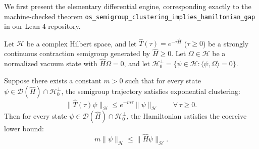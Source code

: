 We first present the elementary differential engine, corresponding exactly to the machine-checked theorem \texttt{os\_semigroup\_clustering\_implies\_hamiltonian\_gap} in our Lean 4 repository.

\begin{theorem}
\label{thm:elementary_differential_engine}
Let $\mathcal{H}$ be a complex Hilbert space, and let $\hat{T}(\tau) = e^{-\tau \hat{H}}$ ($\tau \ge 0$) be a strongly continuous contraction semigroup generated by $\hat{H} \ge 0$. Let $\Omega \in \mathcal{H}$ be a normalized vacuum state with $\hat{H}\Omega = 0$, and let $\mathcal{H}_0^\perp = \{\psi \in \mathcal{H} : \langle \psi, \Omega \rangle = 0\}$.

Suppose there exists a constant $m > 0$ such that for every state $\psi \in \mathcal{D}(\hat{H}) \cap \mathcal{H}_0^\perp$, the semigroup trajectory satisfies exponential clustering:
\begin{equation}
\label{eq:semigroup_exponential_clustering}
\|\hat{T}(\tau) \psi\|_{\mathcal{H}} \le e^{-m \tau} \|\psi\|_{\mathcal{H}} \qquad \forall \, \tau \ge 0.
\end{equation}
Then for every state $\psi \in \mathcal{D}(\hat{H}) \cap \mathcal{H}_0^\perp$, the Hamiltonian satisfies the coercive lower bound:
\begin{equation}
\label{eq:hamiltonian_coercive_lower_bound}
m \|\psi\|_{\mathcal{H}} \le \|\hat{H} \psi\|_{\mathcal{H}}.
\end{equation}
\end{theorem}

